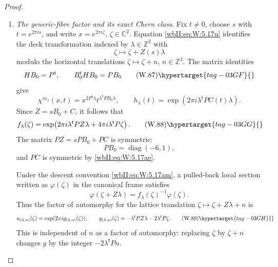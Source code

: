 \begin{proof}
\begin{enumerate}[label=\arabic*.,leftmargin=*]
\item \emph{The generic-fibre factor and its exact Chern class.}
Fix \(t\ne0\), choose \(s\) with \(t=e^{2\pi i s}\), and write
\(x=e^{2\pi i\zeta}\), \(\zeta\in\mathbb C^2\).
Equation \eqref{wbII:eq:W:5.17u} identifies the deck transformation indexed by
\(\lambda\in\mathbb Z^2\) with
\[
 \zeta\longmapsto\zeta+Z(s)\lambda
\]
modulo the horizontal translations
\(\zeta\mapsto\zeta+n\), \(n\in\mathbb Z^2\).  The matrix identities
\[
 HB_0=P^{\mathsf t},
 \qquad
 B_0^{\mathsf t}HB_0=PB_0
\tag{W.87}\hypertarget{tag-03GF}{}\label{wbII:eq:W:5.17at}
\]
give
\[
 \chi^{m_\lambda}(x,t)
 =x^{2P^{\mathsf t}\lambda}
  t^{\lambda^{\mathsf t}PB_0\lambda},
\qquad
 h_\lambda(t)
 =\exp(2\pi i\lambda^{\mathsf t}PC(t)\lambda).
\]
Since \(Z=sB_0+C\), it follows that
\[
 f_\lambda(\zeta)
 =\exp\!\left(
 2\pi i\lambda^{\mathsf t}PZ\lambda+
 4\pi i\lambda^{\mathsf t}P\zeta\right).
\tag{W.88}\hypertarget{tag-03GG}{}\label{wbII:eq:W:5.17au}
\]
The matrix \(PZ=sPB_0+PC\) is symmetric:
\[
 PB_0=\operatorname{diag}(-6,1),
\]
and \(PC\) is symmetric by \eqref{wbII:eq:W:5.17ae}.

Under the descent convention \eqref{wbII:eq:W:5.17am}, a pulled-back local section
written as \(\varphi(\zeta)\) in the canonical frame satisfies
\[
 \varphi(\zeta+Z\lambda)
 =f_\lambda(\zeta)^{-1}\varphi(\zeta).
\]
Thus the factor of automorphy for the lattice translation
\(\zeta\mapsto\zeta+Z\lambda+n\) is
\[
 a_{(\lambda,n)}(\zeta)
 =\exp(2\pi i g_{(\lambda,n)}(\zeta)),
\qquad
 g_{(\lambda,n)}(\zeta)
 =-\lambda^{\mathsf t}PZ\lambda
  -2\lambda^{\mathsf t}P\zeta.
\tag{W.89}\hypertarget{tag-03GH}{}\label{wbII:eq:W:5.17av}
\]
This is independent of \(n\) as a factor of automorphy: replacing
\(\zeta\) by \(\zeta+n\) changes \(g\) by the integer
\(-2\lambda^{\mathsf t}Pn\).


\end{enumerate}
\end{proof}
